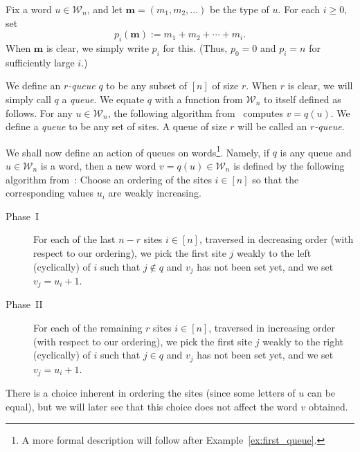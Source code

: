 \documentclass[reqno]{amsart}
\newcommand{\0}{\phantom{c}}
\newcommand{\mm}{\mathbf{m}}
\newcommand{\mcW}{\mathcal{W}}
\newenvironment{verlong}{}{}
\newenvironment{vershort}{}{}
\newcommand{\ive}[1]{\left[ #1 \right]}
\newcommand{\defn}[1]{{\color{darkred}\emph{#1}}} %
\theoremstyle{plain}
\theoremstyle{definition}
\numberwithin{equation}{section}
\begin{document}
Fix a word $u \in \mcW_n$, and let $\mm = (m_1, m_2, \ldots)$ be the type of $u$.
For each $i \geq 0$, set
\begin{equation}
\label{eq:type_partial_sums}
p_i(\mm) := m_1 + m_2 + \cdots + m_i.
\end{equation}
When $\mm$ is clear, we simply write $p_i$ for this.
(Thus, $p_0 = 0$ and $p_i = n$ for sufficiently large $i$.)

\begin{vershort}
We define an \defn{$r$-queue} $q$ to be any subset of $\ive{n}$ of size $r$. When $r$ is clear, we will simply call $q$ a \defn{queue}.
We equate $q$ with a function from $\mcW_n$ to itself defined as follows.
For any $u \in \mcW_n$, the following algorithm from~\cite[Sec.~4.5]{AAMP} computes $v = q(u)$.
\end{vershort}
\begin{verlong}
We define a \defn{queue} to be any set of sites.
A queue of size $r$ will be called an \defn{$r$-queue}.

We shall now define an action of queues on words\footnote{%
A more formal description will follow after
Example~\ref{ex:first_queue}.}.
Namely, if $q$ is any queue and $u \in \mcW_n$ is a word,
then a new word $v = q(u) \in \mcW_n$ is defined by the following algorithm from~\cite[Sec.~4.5]{AAMP}:
\end{verlong}
Choose an ordering of the sites $i \in \ive{n}$ so that the corresponding values $u_i$ are weakly increasing.
\begin{description}
\item[Phase~I]
   For each of the last $n - r$ sites $i \in \ive{n}$, traversed in decreasing order (with respect to our ordering), we pick the first site $j$ weakly to the left (cyclically) of $i$ such that $j \notin q$ and $v_j$ has not been set yet, and we set $v_j = u_i + 1$.
\item[Phase~II]
   For each of the remaining $r$ sites $i \in \ive{n}$, traversed in increasing order (with respect to our ordering), we pick the first site $j$ weakly to the right (cyclically) of $i$ such that $j \in q$ and $v_j$ has not been set yet, and we set $v_j = u_i + 1$.
\end{description}
There is a choice inherent in ordering the sites
(since some letters of $u$ can be equal), but we
will later see that this choice does not affect
the word $v$ obtained.
\end{document}
